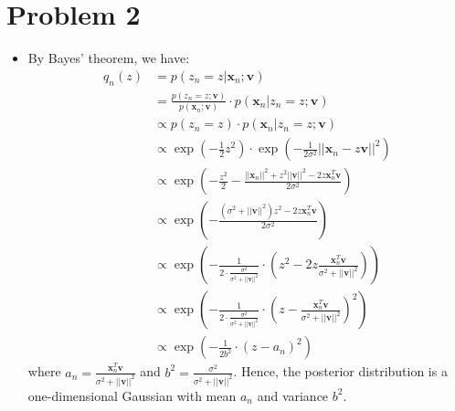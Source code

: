 \documentclass{article}
\newcommand{\mbi}[1]{\boldsymbol{#1}}
\begin{document}
\section{Problem 2}
  \begin{itemize}
    \item[\textbf{2.1}] By Bayes' theorem, we have:
    \begin{align*}
      q_n(z) &= p(z_n = z | \mbi{x}_n; \mbi{v}) \\
      &= \frac{p(z_n = z; \mbi{v})}{p(\mbi{x}_n; \mbi{v})} \cdot p(\mbi{x}_n | z_n = z; \mbi{v}) \\
      &\propto p(z_n = z) \cdot p(\mbi{x}_n | z_n = z; \mbi{v}) \\
      &\propto \exp\left(-\frac{1}{2} z^2\right) \cdot \exp\left(-\frac{1}{2\sigma^2} ||\mbi{x}_n - z \mbi{v}||^2\right) \\
      &\propto \exp\left(-\frac{z^2}{2} - \frac{||\mbi{x}_n||^2 + z^2||\mbi{v}||^2 - 2z \mbi{x}_n^T \mbi{v}}{2\sigma^2}\right) \\
      &\propto \exp\left(-\frac{(\sigma^2 + ||\mbi{v}||^2)z^2 - 2z \mbi{x}_n^T \mbi{v}}{2\sigma^2}\right) \\
      &\propto \exp\left(-\frac{1}{2 \cdot \frac{\sigma^2}{\sigma^2 + ||\mbi{v}||^2}} \cdot \left(z^2 - 2z \frac{\mbi{x}_n^T \mbi{v}}{\sigma^2 + ||\mbi{v}||^2}\right)\right) \\
      &\propto \exp\left(-\frac{1}{2 \cdot \frac{\sigma^2}{\sigma^2 + ||\mbi{v}||^2}} \cdot \left(z - \frac{\mbi{x}_n^T \mbi{v}}{\sigma^2 + ||\mbi{v}||^2}\right)^2\right) \\
      &\propto \exp\left(-\frac{1}{2b^2} \cdot (z - a_n)^2\right)
    \end{align*}
    where $a_n = \frac{\mbi{x}_n^T \mbi{v}}{\sigma^2 + ||\mbi{v}||^2}$ and $b^2 = \frac{\sigma^2}{\sigma^2 + ||\mbi{v}||^2}$.
    Hence, the posterior distribution is a one-dimensional Gaussian with mean $a_n$ and variance $b^2$.
  \end{itemize}
  
\end{document}
